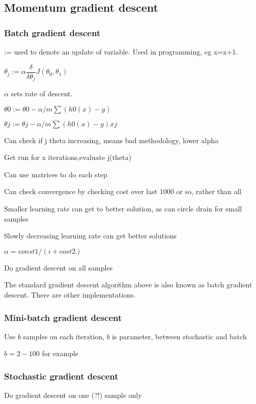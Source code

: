 
\subsection{Momentum gradient descent}

\subsubsection{Batch gradient descent}

:= used to denote an update of variable. Used in programming, eg x=x+1.

\(\theta _j := \alpha \dfrac{\delta }{\delta \theta _j}J(\theta _0,\theta _1)\)

\(\alpha \) sets rate of descent.

\(\theta 0 := \theta 0 - \alpha/m \sum(h0(x) - y)\)

\(\theta j := \theta j - \alpha/m \sum(h0(x) - y)xj\)

Can check if j theta increasing, means bad methodology, lower alpha

Get run for x iterations,evaluate j(theta)

Can use matrices to do each step

Can check convergence by checking cost over last 1000 or so, rather than all

Smaller learning rate can get to better solution, as can circle drain for small samples

Slowly decreasing learning rate can get better solutions

\(\alpha = const1/(i + cost2)\)

Do gradient descent on all samples

The standard gradient descent algorithm above is also known as batch gradient descent. There are other implementations.

\subsubsection{Mini-batch gradient descent}

Use \(b\) samples on each iteration, \(b\) is parameter, between stochastic and batch

\(b=2-100\) for example

\subsubsection{Stochastic gradient descent}

Do gradient descent on one (?!) sample only

